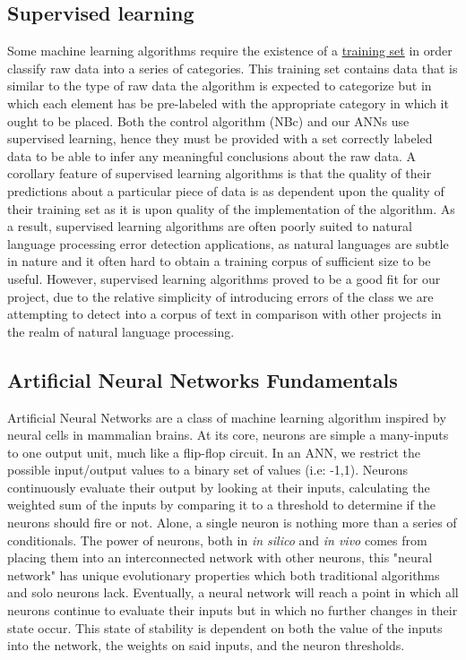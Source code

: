 \documentclass{article}
\begin{document}
\subsection{Supervised learning}
Some machine learning algorithms require the existence of a \underline{training set} in order classify raw data into a series of categories. This training set contains data that is similar to the type of raw data the algorithm is expected to categorize but in which each element has be pre-labeled with the appropriate category in which it ought to be placed. Both the control algorithm (NBc) and our ANNs use supervised learning, hence they must be provided with a set correctly labeled data to be able to infer any meaningful conclusions about the raw data. A corollary feature of supervised learning algorithms is that the quality of their predictions about a particular piece of data is as dependent upon the quality of their training set as it is upon quality of the implementation of the algorithm. As a result, supervised learning algorithms are often poorly suited to natural language processing error detection applications, as natural languages are subtle in nature and it often hard to obtain a training corpus of sufficient size to be useful.
However, supervised learning algorithms proved to be a good fit for our project, due to the relative simplicity of introducing errors of the class we are attempting to detect into a corpus of text in comparison with other projects in the realm of natural language processing. 
\subsection{Artificial Neural Networks Fundamentals}
Artificial Neural Networks are a class of machine learning algorithm inspired by neural cells in mammalian brains. At its core, neurons are simple a many-inputs to one output unit, much like a flip-flop circuit. In an ANN, we restrict the possible input/output values to a binary set of values (i.e: -1,1). 
Neurons continuously evaluate their output by looking at their inputs, calculating the weighted sum of the inputs by comparing it to a threshold to determine if the neurons should fire or not. Alone, a single neuron is nothing more than a series of conditionals. The power of neurons, both in \textit{in silico} and \textit{in vivo} comes from placing them into an interconnected network with other neurons, this "neural network" has unique evolutionary properties which both traditional algorithms and solo neurons lack. Eventually, a neural network will reach a point in which all neurons continue to evaluate their inputs but in which no further changes in their state occur. This state of stability is dependent on both the value of the inputs into the network, the weights on said inputs, and the neuron thresholds. 
\end{document}
